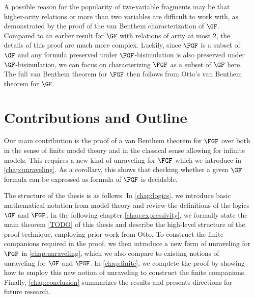 A possible reason for the popularity of two-variable fragments may be that higher-arity relations or more than two variables are difficult to work with, as demonstrated by the proof of the van Benthem characterization of $\GF$\cite{Otto2012}.
Compared to an earlier result for $\GF$ with relations of arity at most 2\cite{Otto04}, the details of this proof are much more complex.
Luckily, since $\FGF$ is a subset of $\GF$ and any formula preserved under $\FGF$-bisimulation is also preserved under $\GF$-bisimulation, we can focus on characterizing $\FGF$ as a subset of $\GF$ here.
The full van Benthem theorem for $\FGF$ then follows from Otto's van Benthem theorem for $\GF$.

\section{Contributions and Outline}

Our main contribution is the proof of a van Benthem theorem for $\FGF$ over both in the sense of finite model theory and in the classical sense allowing for infinite models.
This requires a new kind of unraveling for $\FGF$ which we introduce in \ref{chap:unraveling}.
As a corollary, this shows that checking whether a given $\GF$ formula can be expressed as formula of $\FGF$ is decidable.

The structure of the thesis is as follows.
In \cref{chap:logics}, we introduce basic mathematical notation from model theory and review the definitions of the logics $\GF$ and $\FGF$.
In the following chapter \cref{chap:expressivity}, we formally state the main theorem \cref{TODO} of this thesis and describe the high-level structure of the proof technique, employing prior work from Otto.
To construct the finite companions required in the proof, we then introduce a new form of unraveling for $\FGF$ in \cref{chap:unraveling}, which we also compare to existing notions of unraveling for $\GF$ and $\FGF$.
In \cref{chap:finite}, we complete the proof by showing how to employ this new notion of unraveling to construct the finite companions.
Finally, \cref{chap:conclusion} summarizes the results and presents directions for future research.
